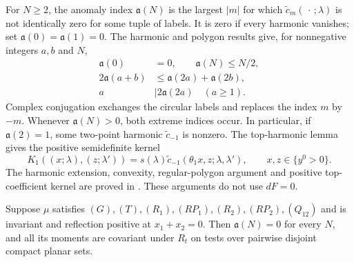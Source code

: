 \documentclass[11pt,letterpaper,reqno]{amsart}
\makeatletter
\theoremstyle{definition}
\newcommand{\ms@minorstart}{%
  \pushQED{\qed}\renewcommand{\qedsymbol}{$\blacksquare$}}
\newenvironment{proposition}[1][]{\ms@minorstart\ms@proposition[#1]}
  {\popQED\endms@proposition}
\theoremstyle{remark}
\makeatother
\begin{document}
For $N\ge2$, the anomaly index $\mathfrak a(N)$ is the largest
$|m|$ for which $\widetilde c_m(\,\cdot\,;\lambda)$ is not identically
zero for some tuple of labels. It is zero if every harmonic vanishes;
set $\mathfrak a(0)=\mathfrak a(1)=0$. The harmonic and polygon
results give, for nonnegative integers $a,b$ and $N$,
\begin{align}
 \mathfrak a(0)&=0,\qquad \mathfrak a(N)\le N/2,\label{eq:anomaly-linear}\\
 2\mathfrak a(a+b)&\le\mathfrak a(2a)+\mathfrak a(2b),
 \label{eq:anomaly-convex}\\
 a&\mid 2\mathfrak a(2a)\quad(a\ge1).
 \label{eq:anomaly-polygon}
\end{align}
Complex conjugation exchanges the circular labels and replaces the
index $m$ by $-m$. Whenever $\mathfrak a(N)>0$, both extreme indices
occur. In particular, if
$\mathfrak a(2)=1$, some two-point harmonic $\widetilde c_{-1}$ is
nonzero. The top-harmonic lemma gives the positive
semidefinite kernel
\begin{equation}\label{eq:top-kernel}
 K_1((x;\lambda),(z;\lambda'))
 =s(\lambda)\widetilde c_{-1}(\theta_1x,z;\lambda,\lambda'),
 \qquad x,z\in\{y^0>0\}.
\end{equation}
The harmonic extension, convexity, regular-polygon argument and
positive top-coefficient kernel are proved in
\cite[Sections~8.7--8.9]{QEDCurrent}. These arguments do not use
$dF=0$.

\begin{proposition}\label{prop:separated}
Suppose $\mu$ satisfies $(G),(T),(R_1),(RP_1),(R_2),(RP_2),(Q_{12})$
and is invariant and reflection positive at $x_1+x_2=0$.
Then $\mathfrak a(N)=0$ for every $N$, and all its moments are
covariant under $R_t$ on tests over pairwise disjoint compact planar
sets.
\end{proposition}
\end{document}
